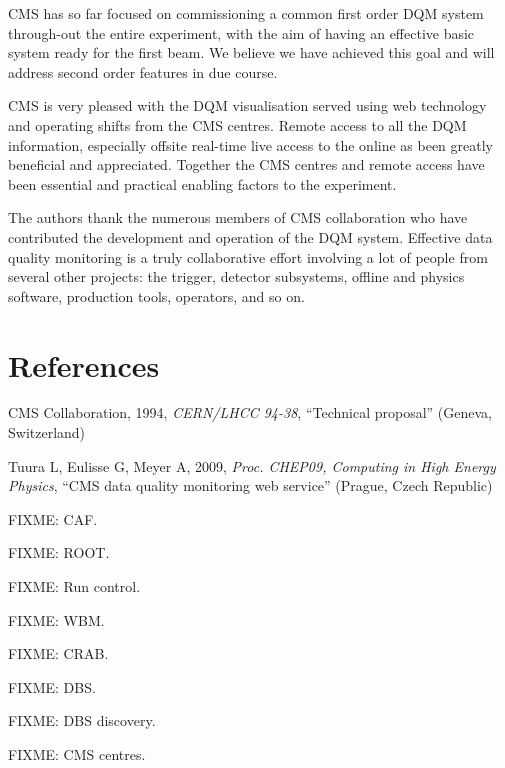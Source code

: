 \documentclass[a4paper]{jpconf}
\begin{document}
CMS has so far focused on commissioning a common first order DQM system
through-out the entire experiment, with the aim of having an effective basic
system ready for the first beam.  We believe we have achieved this goal and
will address second order features in due course.

CMS is very pleased with the DQM visualisation served using web technology and
operating shifts from the CMS centres.  Remote access to all the DQM
information, especially offsite real-time live access to the online as been
greatly beneficial and appreciated.  Together the CMS centres and remote
access have been essential and practical enabling factors to the experiment.


\ack

The authors thank the numerous members of CMS collaboration who have
contributed the development and operation of the DQM system.  Effective data
quality monitoring is a truly collaborative effort involving a lot of people
from several other projects: the trigger, detector subsystems, offline and
physics software, production tools, operators, and so on.
 

\section*{References}
\begin{thebibliography}{9}

  CMS Collaboration,
  1994, {\it CERN/LHCC 94-38},
  ``Technical proposal''
  (Geneva, Switzerland)

  Tuura L, Eulisse G, Meyer A,
  2009, {\it Proc. CHEP09, Computing in High Energy Physics},
  ``CMS data quality monitoring web service''
  (Prague, Czech Republic)

  FIXME: CAF.

  FIXME: ROOT.

  FIXME: Run control.

  FIXME: WBM.

  FIXME: CRAB.

  FIXME: DBS.

  FIXME: DBS discovery.

  FIXME: CMS centres.

\end{thebibliography}
\end{document}
